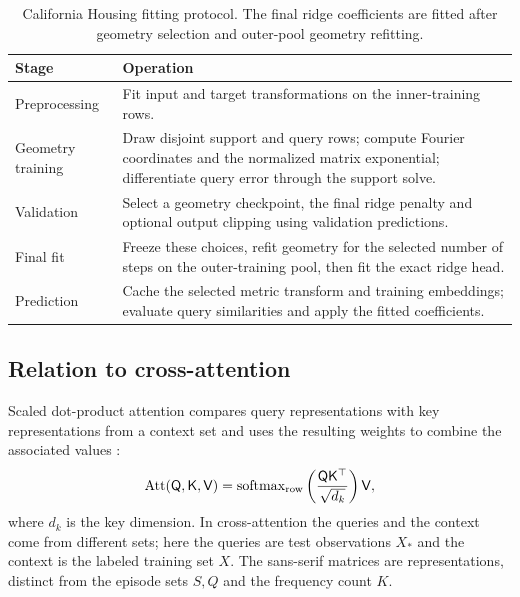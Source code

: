 \documentclass[11pt]{article}
\begin{document}
\begin{table}[htbp]
\centering\small
\caption{California Housing fitting protocol. The final ridge coefficients are fitted after geometry selection and outer-pool geometry refitting.}\label{tab:workflow}
\begin{tabular}{p{.21\linewidth}p{.70\linewidth}}\toprule
Stage & Operation\\\midrule
Preprocessing & Fit input and target transformations on the inner-training rows.\\
Geometry training & Draw disjoint support and query rows; compute Fourier coordinates and the normalized matrix exponential; differentiate query error through the support solve.\\
Validation & Select a geometry checkpoint, the final ridge penalty and optional output clipping using validation predictions.\\
Final fit & Freeze these choices, refit geometry for the selected number of steps on the outer-training pool, then fit the exact ridge head.\\
Prediction & Cache the selected metric transform and training embeddings; evaluate query similarities and apply the fitted coefficients.\\\bottomrule
\end{tabular}
\end{table}

\subsection{Relation to cross-attention}\label{sec:attention}
Scaled dot-product attention compares query representations with key representations from a context set and uses the resulting weights to combine the associated values \cite[Section~3.2.1]{vaswani2017}:
\begin{equation}
 \operatorname{Att}(\mathsf Q,\mathsf K,\mathsf V)
 =\operatorname{softmax}_{\rm row}
   \left(\frac{\mathsf Q\mathsf K^\top}{\sqrt{d_k}}\right)\mathsf V,
 \label{eq:standard-attention}
\end{equation}
where $d_k$ is the key dimension. In cross-attention the queries and the context come from different sets; here the queries are test observations $X_*$ and the context is the labeled training set $X$. The sans-serif matrices are representations, distinct from the episode sets $S,Q$ and the frequency count $K$.
\end{document}
